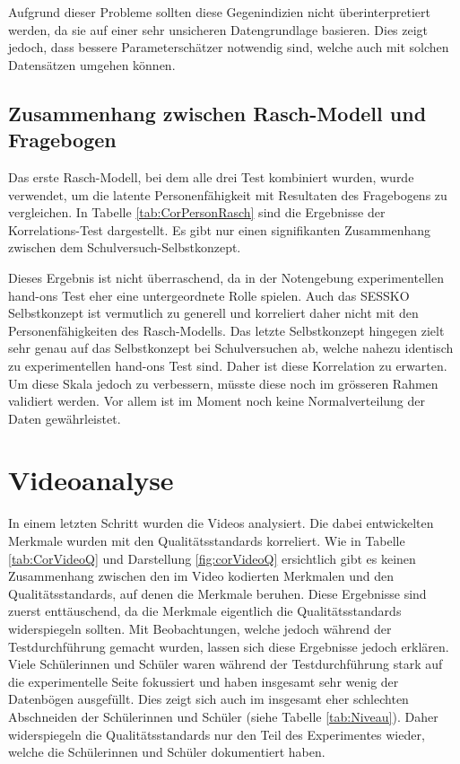 Aufgrund dieser Probleme sollten diese Gegenindizien nicht überinterpretiert werden, da sie auf einer sehr unsicheren Datengrundlage basieren. Dies zeigt jedoch, dass bessere Parameterschätzer notwendig sind, welche auch mit solchen Datensätzen umgehen können.

\subsection{Zusammenhang zwischen Rasch-Modell und Fragebogen}

Das erste Rasch-Modell, bei dem alle drei Test kombiniert wurden, wurde verwendet, um die latente Personenfähigkeit mit Resultaten des Fragebogens zu vergleichen. In Tabelle \ref{tab:CorPersonRasch} sind die Ergebnisse der Korrelations-Test dargestellt. Es gibt nur einen signifikanten Zusammenhang zwischen dem Schulversuch-Selbstkonzept. 

Dieses Ergebnis ist nicht überraschend, da in der Notengebung experimentellen hand-ons Test eher eine untergeordnete Rolle spielen. Auch das SESSKO Selbstkonzept \citep{Schone2002} ist vermutlich zu generell und korreliert daher nicht mit den Personenfähigkeiten des Rasch-Modells. Das letzte Selbstkonzept hingegen zielt sehr genau auf das Selbstkonzept bei Schulversuchen ab, welche nahezu identisch zu experimentellen hand-ons Test sind. Daher ist diese Korrelation zu erwarten. Um diese Skala jedoch zu verbessern, müsste diese noch im grösseren Rahmen validiert werden. Vor allem ist im Moment noch keine Normalverteilung der Daten gewährleistet.

\section{Videoanalyse}

In einem letzten Schritt wurden die Videos analysiert. Die dabei entwickelten Merkmale wurden mit den Qualitätsstandards korreliert. Wie in Tabelle \ref{tab:CorVideoQ} und Darstellung \ref{fig:corVideoQ} ersichtlich gibt es keinen Zusammenhang zwischen den im Video kodierten Merkmalen und den Qualitätsstandards, auf denen die Merkmale beruhen. Diese Ergebnisse sind zuerst enttäuschend, da die Merkmale eigentlich die Qualitätsstandards widerspiegeln sollten. Mit Beobachtungen, welche jedoch während der Testdurchführung gemacht wurden, lassen sich diese Ergebnisse jedoch erklären. Viele Schülerinnen und Schüler waren während der Testdurchführung stark auf die experimentelle Seite fokussiert und haben insgesamt sehr wenig der Datenbögen ausgefüllt. Dies zeigt sich auch im insgesamt eher schlechten Abschneiden der Schülerinnen und Schüler (siehe Tabelle \ref{tab:Niveau}). Daher widerspiegeln die Qualitätsstandards nur den Teil des Experimentes wieder, welche die Schülerinnen und Schüler dokumentiert haben. 

